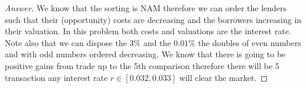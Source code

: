 \documentclass{article}
\theoremstyle{definition}
\begin{document}
\begin{proof}[Answer]
 
We know that the sorting is NAM therefore we can order the lenders such that their (opportunity) costs are decreasing and the borrowers increasing in their valuation. In this problem both costs and valuations are the interest rate. Note also that we can dispose the $3\%$ and the $0.01\%$ the doubles of even numbers and with odd numbers ordered decreasing. We know that there is going to be positive gains from trade up to the 5th comparison therefore there will be 5 transaction any interest rate $r\in[0.032, 0.033]$ will clear the market.

\end{proof}
\end{document}
